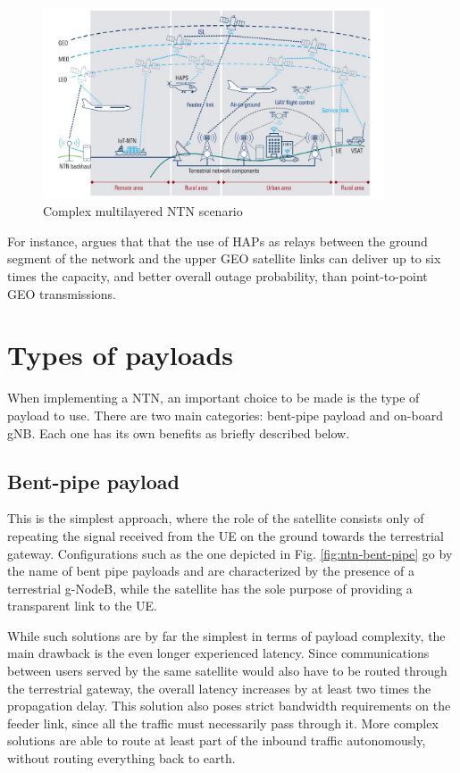 \begin{figure}[ht]
    \centering
    \includegraphics[width=0.9\textwidth]{res/multilayered-ntn.jpg}
    \caption{Complex multilayered \ac{NTN} scenario \cite{connecting-ntn-rohde-schwarz}}
    \label{fig:multilayered-ntn}
\end{figure}

For instance, \cite{potential-multilayered-nierarchical-ntn-wang} argues that that the use of \acp{HAP} as relays between the ground segment of the network and the upper \ac{GEO} satellite links can deliver up to six times the capacity, and better overall outage probability, than point-to-point \ac{GEO} transmissions.


\section{Types of payloads}
When implementing a \ac{NTN}, an important choice to be made is the type of payload to use. There are two main categories: bent-pipe payload and on-board \ac{gNB}. Each one has its own benefits as briefly described below.

\subsection{Bent-pipe payload}
\label{sec:bent-pipe-payload}
This is the simplest approach, where the role of the satellite consists only of  repeating the signal received from the \ac{UE} on the ground towards the terrestrial gateway. Configurations such as the one depicted in Fig. \ref{fig:ntn-bent-pipe} go by the name of bent pipe payloads and are characterized by the presence of a terrestrial g-NodeB, while the satellite has the sole purpose of providing a transparent link to the \ac{UE}.

While such solutions are by far the simplest in terms of payload complexity, the main drawback is the even longer experienced latency. Since communications between users served by the same satellite would also have to be routed through the terrestrial gateway, the overall latency increases by at least two times the propagation delay.
This solution also poses strict bandwidth requirements on the feeder link, since all the traffic must necessarily pass through it.
More complex solutions are able to route at least part of the inbound traffic autonomously, without routing everything back to earth.

